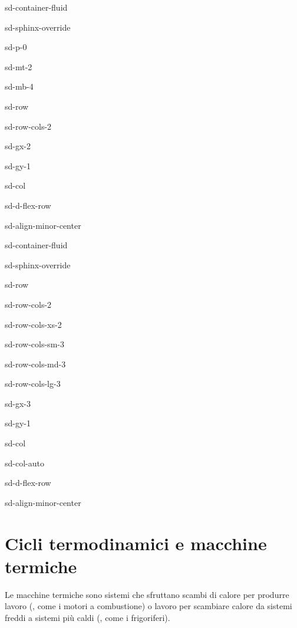 \documentclass[letterpaper,10pt,english]{jupyterBook}
\begin{document}
\begin{sphinxuseclass}{sd-container-fluid}
\begin{sphinxuseclass}{sd-sphinx-override}
\begin{sphinxuseclass}{sd-p-0}
\begin{sphinxuseclass}{sd-mt-2}
\begin{sphinxuseclass}{sd-mb-4}
\begin{sphinxuseclass}{sd-row}
\begin{sphinxuseclass}{sd-row-cols-2}
\begin{sphinxuseclass}{sd-gx-2}
\begin{sphinxuseclass}{sd-gy-1}
\begin{sphinxuseclass}{sd-col}
\begin{sphinxuseclass}{sd-d-flex-row}
\begin{sphinxuseclass}{sd-align-minor-center}
\begin{sphinxuseclass}{sd-container-fluid}
\begin{sphinxuseclass}{sd-sphinx-override}
\begin{sphinxuseclass}{sd-row}
\begin{sphinxuseclass}{sd-row-cols-2}
\begin{sphinxuseclass}{sd-row-cols-xs-2}
\begin{sphinxuseclass}{sd-row-cols-sm-3}
\begin{sphinxuseclass}{sd-row-cols-md-3}
\begin{sphinxuseclass}{sd-row-cols-lg-3}
\begin{sphinxuseclass}{sd-gx-3}
\begin{sphinxuseclass}{sd-gy-1}
\begin{sphinxuseclass}{sd-col}
\begin{sphinxuseclass}{sd-col-auto}
\begin{sphinxuseclass}{sd-d-flex-row}
\begin{sphinxuseclass}{sd-align-minor-center}
\end{sphinxuseclass}
\end{sphinxuseclass}
\end{sphinxuseclass}
\end{sphinxuseclass}
\end{sphinxuseclass}
\end{sphinxuseclass}
\end{sphinxuseclass}
\end{sphinxuseclass}
\end{sphinxuseclass}
\end{sphinxuseclass}
\end{sphinxuseclass}
\end{sphinxuseclass}
\end{sphinxuseclass}
\end{sphinxuseclass}
\end{sphinxuseclass}
\end{sphinxuseclass}
\end{sphinxuseclass}
\end{sphinxuseclass}
\end{sphinxuseclass}
\end{sphinxuseclass}
\end{sphinxuseclass}
\end{sphinxuseclass}
\end{sphinxuseclass}
\end{sphinxuseclass}
\end{sphinxuseclass}
\end{sphinxuseclass}

\chapter{Cicli termodinamici e macchine termiche}
\label{\detokenize{ch/heat_engines:cicli-termodinamici-e-macchine-termiche}}\label{\detokenize{ch/heat_engines:classical-thermodynamics-heat-engines}}\label{\detokenize{ch/heat_engines::doc}}
\sphinxAtStartPar
Le macchine termiche sono sistemi che sfruttano scambi di calore per produrre lavoro (, come i motori a combustione) o lavoro per scambiare calore da sistemi freddi a sistemi più caldi (, come i frigoriferi).
\end{document}

